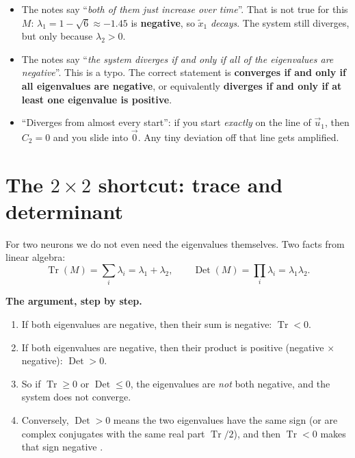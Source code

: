 \begin{pitfall}
\begin{itemize}
  \item The notes say ``\emph{both of them just increase over time}''. That is not true for this $M$: $\lambda_1 = 1-\sqrt6\approx-1.45$ is \textbf{negative}, so
        $\tilde x_1$ \emph{decays}. The system still diverges, but only because $\lambda_2 > 0$.
  \item The notes say ``\emph{the system diverges if and only if all of the eigenvalues are negative}''. This is a typo. The correct statement is
        \textbf{converges if and only if all eigenvalues are negative}, or equivalently \textbf{diverges if and only if at least one eigenvalue is positive}.
  \item ``Diverges from almost every start'': if you start \emph{exactly} on the line of $\vec u_1$, then $C_2=0$ and you slide into $\vec 0$.
        Any tiny deviation off that line gets amplified.
\end{itemize}
\end{pitfall}

\section{The $2\times2$ shortcut: trace and determinant}

For two neurons we do not even need the eigenvalues themselves. Two facts from linear algebra:
\[ \operatorname{Tr}(M) = \sum_i\lambda_i = \lambda_1+\lambda_2, \qquad \operatorname{Det}(M) = \prod_i\lambda_i = \lambda_1\lambda_2. \]

\textbf{The argument, step by step.}
\begin{enumerate}
  \item If both eigenvalues are negative, then their sum is negative: $\operatorname{Tr}<0$.
  \item If both eigenvalues are negative, then their product is positive (negative $\times$ negative): $\operatorname{Det}>0$.
  \item So if $\operatorname{Tr}\ge 0$ or $\operatorname{Det}\le 0$, the eigenvalues are \emph{not} both negative, and the system does not converge.
  \item Conversely, $\operatorname{Det}>0$ means the two eigenvalues have the same sign (or are complex conjugates with the same real part $\operatorname{Tr}/2$),
        and then $\operatorname{Tr}<0$ makes that sign negative .
\end{enumerate}


